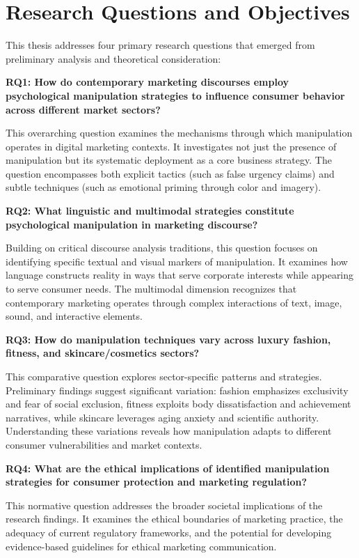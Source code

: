 \section{Research Questions and Objectives}
\label{sec:research_questions}

This thesis addresses four primary research questions that emerged from preliminary analysis and theoretical consideration:

\textbf{RQ1: How do contemporary marketing discourses employ psychological manipulation strategies to influence consumer behavior across different market sectors?}

This overarching question examines the mechanisms through which manipulation operates in digital marketing contexts. It investigates not just the presence of manipulation but its systematic deployment as a core business strategy. The question encompasses both explicit tactics (such as false urgency claims) and subtle techniques (such as emotional priming through color and imagery).

\textbf{RQ2: What linguistic and multimodal strategies constitute psychological manipulation in marketing discourse?}

Building on critical discourse analysis traditions, this question focuses on identifying specific textual and visual markers of manipulation. It examines how language constructs reality in ways that serve corporate interests while appearing to serve consumer needs. The multimodal dimension recognizes that contemporary marketing operates through complex interactions of text, image, sound, and interactive elements.

\textbf{RQ3: How do manipulation techniques vary across luxury fashion, fitness, and skincare/cosmetics sectors?}

This comparative question explores sector-specific patterns and strategies. Preliminary findings suggest significant variation: fashion emphasizes exclusivity and fear of social exclusion, fitness exploits body dissatisfaction and achievement narratives, while skincare leverages aging anxiety and scientific authority. Understanding these variations reveals how manipulation adapts to different consumer vulnerabilities and market contexts.

\textbf{RQ4: What are the ethical implications of identified manipulation strategies for consumer protection and marketing regulation?}

This normative question addresses the broader societal implications of the research findings. It examines the ethical boundaries of marketing practice, the adequacy of current regulatory frameworks, and the potential for developing evidence-based guidelines for ethical marketing communication.

